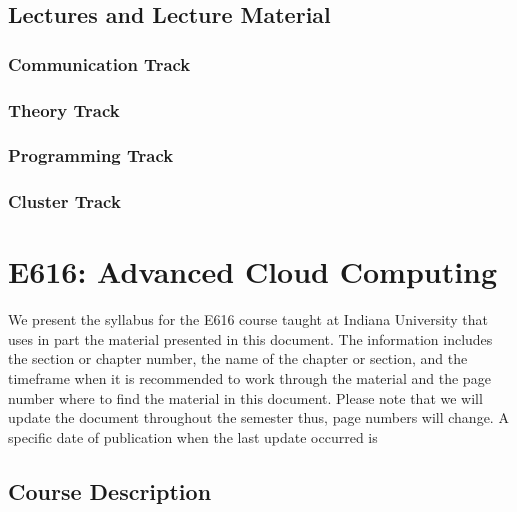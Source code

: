 \section{Lectures and Lecture Material}

\subsection{Communication Track}


\subsection{Theory Track}



\subsection{Programming Track}

\subsection{Cluster Track}

\chapter{E616: Advanced Cloud Computing}

We present the syllabus for the E616 course taught at Indiana
University that uses in part the material presented in this
document. The information includes the section or chapter number, the
name of the chapter or section, and the timeframe when it is
recommended to work through the material and the page number where to
find the material in this document. Please note that we will update
the document throughout the semester thus, page numbers will change. A
specific date of publication when the last update occurred is

\TODAY

\section{Course Description }

